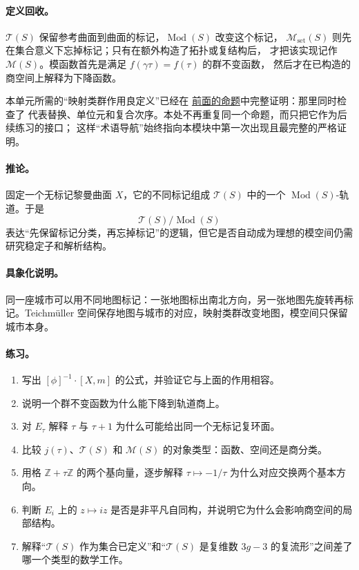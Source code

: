 \documentclass[UTF8,fontset=none,a4paper,11pt]{ctexart}
\theoremstyle{foundation-definition}
\theoremstyle{foundation-theorem}
\theoremstyle{foundation-proposition}
\theoremstyle{foundation-example}
\theoremstyle{foundation-remark}
\theoremstyle{foundation-theorem}
\newcommand{\T}{\mathcal T}
\newcommand{\M}{\mathcal M}
\newcommand{\Mod}{\operatorname{Mod}}
\newcommand{\term}[2]{\hyperref[#1]{#2}}
\begin{document}
\paragraph{定义回收。}
\(\T(S)\) 保留参考曲面到曲面的标记，\(\Mod(S)\) 改变这个标记，
\(\M_{\mathrm{set}}(S)\) 则先在集合意义下忘掉标记；只有在额外构造了拓扑或复结构后，
才把该实现记作 \(\M(S)\)。模函数首先是满足 \(f(\gamma\tau)=f(\tau)\) 的群不变函数，
然后才在已构造的商空间上解释为下降函数。

本单元所需的“映射类群作用良定义”已经在
\term{prop:teich-action-well-defined}{前面的命题}中完整证明：那里同时检查了
代表替换、单位元和复合次序。本处不再重复同一个命题，而只把它作为后续练习的接口；
这样“术语导航”始终指向本模块中第一次出现且最完整的严格证明。

\paragraph{推论。}
固定一个无标记黎曼曲面 \(X\)，它的不同标记组成 \(\T(S)\) 中的一个 \(\Mod(S)\)-轨道。于是
\[
\T(S)/\Mod(S)
\]
表达“先保留标记分类，再忘掉标记”的逻辑，但它是否自动成为理想的模空间仍需研究稳定子和解析结构。

\paragraph{具象化说明。}
同一座城市可以用不同地图标记：一张地图标出南北方向，另一张地图先旋转再标记。Teichmüller 空间保存地图与城市的对应，映射类群改变地图，模空间只保留城市本身。

\paragraph{练习。}
\begin{enumerate}[label=M7.\arabic*.]
  \item 写出 \([\phi]^{-1}\cdot[X,m]\) 的公式，并验证它与上面的作用相容。
  \item 说明一个群不变函数为什么能下降到轨道商上。
  \item 对 \(E_\tau\) 解释 \(\tau\) 与 \(\tau+1\) 为什么可能给出同一个无标记复环面。
  \item 比较 \(j(\tau)\)、\(\T(S)\) 和 \(\M(S)\) 的对象类型：函数、空间还是商分类。
  \item 用格 \(\mathbb Z+\tau\mathbb Z\) 的两个基向量，逐步解释 \(\tau\mapsto-1/\tau\) 为什么对应交换两个基本方向。
  \item 判断 \(E_i\) 上的 \(z\mapsto iz\) 是否是非平凡自同构，并说明它为什么会影响商空间的局部结构。
  \item 解释“\(\T(S)\) 作为集合已定义”和“\(\T(S)\) 是复维数 \(3g-3\) 的复流形”之间差了哪一个类型的数学工作。
\end{enumerate}
\end{document}
